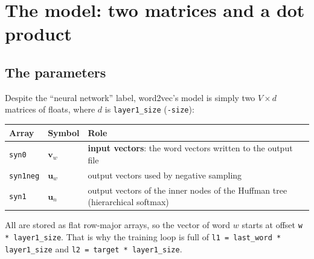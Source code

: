 \documentclass[11pt,a4paper]{article}
\newcommand{\code}[1]{\texttt{#1}}
\newcommand{\vin}{\mathbf{v}}
\newcommand{\vout}{\mathbf{u}}
\begin{document}
\section{The model: two matrices and a dot product}

\subsection{The parameters}

Despite the ``neural network'' label, word2vec's model is simply two
$V\times d$ matrices of floats, where $d$ is \code{layer1\_size} (\code{-size}):

\begin{center}
\begin{tabularx}{\linewidth}{@{}llX@{}}
\toprule
Array & Symbol & Role \\
\midrule
\code{syn0}    & $\vin_w$ & \textbf{input vectors}: the word vectors written to the output file \\
\code{syn1neg} & $\vout_w$ & output vectors used by negative sampling \\
\code{syn1}    & $\vout_n$ & output vectors of the inner nodes of the Huffman tree (hierarchical softmax) \\
\bottomrule
\end{tabularx}
\end{center}

All are stored as flat row-major arrays, so the vector of word $w$ starts at
offset \code{w * layer1\_size}. That is why the training loop is full of
\code{l1 = last\_word * layer1\_size} and \code{l2 = target * layer1\_size}.
\end{document}
